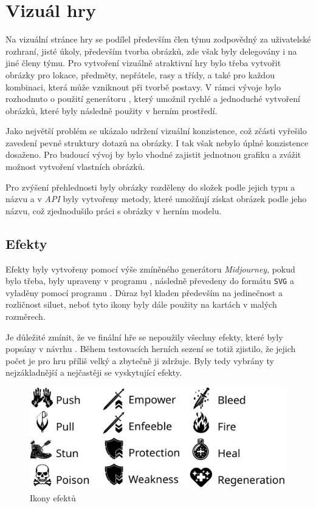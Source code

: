 \section{Vizuál hry}
\label{subsec:game_visuals}

Na vizuální stránce hry se podílel především člen týmu zodpovědný za uživatelské rozhraní, jisté úkoly, především tvorba obrázků, zde však byly delegovány i na jiné členy týmu. Pro vytvoření vizuálně atraktivní hry bylo třeba vytvořit obrázky pro lokace, předměty, nepřátele, rasy a třídy, a také pro každou kombinaci, která může vzniknout při tvorbě postavy. V rámci vývoje bylo rozhodnuto o použití generátoru , který umožnil rychlé a jednoduché vytvoření obrázků, které byly následně použity v herním prostředí.

Jako největší problém se ukázalo udržení vizuální konzistence, což zčásti vyřešilo zavedení pevné struktury dotazů na obrázky. I tak však nebylo úplné konzistence dosaženo. Pro budoucí vývoj by bylo vhodné zajistit jednotnou grafiku a zvážit možnost vytvoření vlastních obrázků.

Pro zvýšení přehlednosti byly obrázky rozděleny do složek podle jejich typu a názvu a v \textit{API} byly vytvořeny metody, které umožňují získat obrázek podle jeho názvu, což zjednodušilo práci s obrázky v herním modelu.

\subsection{Efekty}
\label{subsec:effects}

Efekty  byly vytvořeny pomocí výše zmíněného generátoru \textit{Midjourney}, pokud bylo třeba, byly upraveny v programu , následně převedeny do formátu \texttt{SVG} a vyladěny pomocí programu . Důraz byl kladen především na jedinečnost a rozličnost siluet, neboť tyto ikony byly dále použity na kartách v malých rozměrech.

Je důležité zmínit, že ve finální hře se nepoužily všechny efekty, které byly popsány v návrhu . Během testovacích herních sezení se totiž zjistilo, že jejich počet je pro hru příliš velký a zbytečně ji zdržuje. Byly tedy vybrány ty nejzákladnější a nejčastěji se vyskytující efekty.

\begin{figure}[H]
    \centering
    \includegraphics[scale=0.7]{figures/images/effects.pdf}
    \caption{Ikony efektů}
    \label{fig:effects}
\end{figure}

